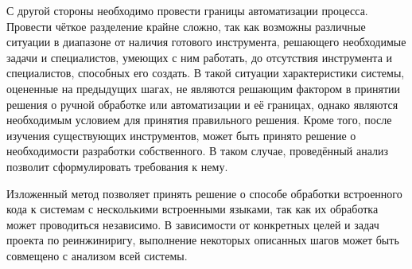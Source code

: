 \begin{enumerate}
  С другой стороны необходимо провести границы автоматизации процесса. Провести чёткое разделение крайне сложно, так как возможны различные ситуации в диапазоне от наличия готового инструмента, решающего необходимые задачи и специалистов, умеющих с ним работать, до отсутствия инструмента и специалистов, способных его создать. В такой ситуации характеристики системы, оцененные на предыдущих шагах, не являются решающим фактором в принятии решения о ручной обработке или автоматизации и её границах, однако являются необходимым условием для принятия правильного решения.
  Кроме того, после изучения существующих инструментов, может быть  принято решение о необходимости разработки собственного. В таком случае, проведённый анализ позволит сформулировать требования к нему.
  
\end{enumerate}

Изложенный метод позволяет принять решение о способе обработки встроенного кода к системам с несколькими встроенными языками, так как их обработка может проводиться независимо. В зависимости от конкретных целей и задач проекта по реинжиниригу, выполнение некоторых описанных шагов может быть совмещено с анализом всей системы.  


\clearpage

